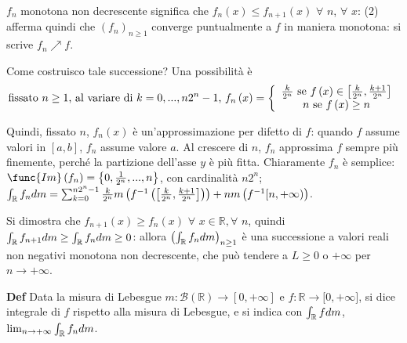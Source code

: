 \documentclass{article}
\begin{document}
$f_{n}$ monotona non decrescente significa che $f_{n}\left( x\right) \leq
f_{n+1}\left( x\right) $ $\forall $ $n$, $\forall $ $x$: (2) afferma quindi
che $\left( f_{n}\right) _{n\geq 1}$ converge puntualmente a $f$ in maniera
monotona: si scrive $f_{n}\nearrow f$.

Come costruisco tale successione? Una possibilit\`{a} \`{e}%
\begin{equation*}
\text{fissato }n\geq 1\text{, al variare di }k=0,...,n2^{n}-1\text{, }%
f_{n}\left( x\right) =\left\{ 
\begin{array}{c}
\frac{k}{2^{n}}\text{ se }f\left( x\right) \in \left[ \frac{k}{2^{n}},\frac{%
k+1}{2^{n}}\right] \\ 
n\text{ se }f\left( x\right) \geq n%
\end{array}%
\right.
\end{equation*}

Quindi, fissato $n$, $f_{n}\left( x\right) $ \`{e} un'approssimazione per
difetto di $f$: quando $f$ assume valori in $\left[ a,b\right] $, $f_{n}$
assume valore $a$. Al crescere di $n$, $f_{n}$ approssima $f$ sempre pi\`{u}
finemente, perch\'{e} la partizione dell'asse $y$ \`{e} pi\`{u} fitta.
Chiaramente $f_{n}$ \`{e} semplice: $\func{Im}\left( f_{n}\right) =\left\{ 0,%
\frac{1}{2^{n}},...,n\right\} $, con cardinalit\`{a} $n2^{n}$; $\int_{%
\mathbb{R}
}f_{n}dm=\sum_{k=0}^{n2^{n}-1}\frac{k}{2^{n}}m\left( f^{-1}\left( \left[ 
\frac{k}{2^{n}},\frac{k+1}{2^{n}}\right] \right) \right) +nm\left(
f^{-1}[n,+\infty )\right) $.

Si dimostra che $f_{n+1}\left( x\right) \geq f_{n}\left( x\right) $ $\forall 
$ $x\in 
\mathbb{R}
,\forall $ $n$, quindi $\int_{%
\mathbb{R}
}f_{n+1}dm\geq \int_{%
\mathbb{R}
}f_{n}dm\geq 0$: allora $\left( \int_{%
\mathbb{R}
}f_{n}dm\right) _{n\geq 1}$ \`{e} una successione a valori reali non
negativi monotona non decrescente, che pu\`{o} tendere a $L\geq 0$ o $%
+\infty $ per $n\rightarrow +\infty $.

\textbf{Def }Data la misura di Lebesgue $m:\mathcal{B}\left( 
\mathbb{R}
\right) \rightarrow \left[ 0,+\infty \right] $ e $f:%
\mathbb{R}
\rightarrow \lbrack 0,+\infty ]$, si dice integrale di $f$ rispetto alla
misura di Lebesgue, e si indica con $\int_{%
\mathbb{R}
}fdm$, $\lim_{n\rightarrow +\infty }\int_{%
\mathbb{R}
}f_{n}dm$.
\end{document}
